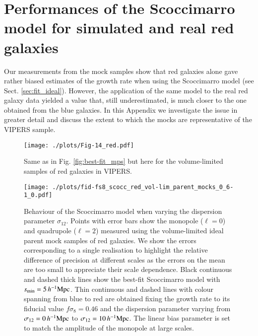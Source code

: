 \documentclass[longauth]{aa}
\def\mhmpc{\,h^{-1}{\rm Mpc}}
\begin{document}
\section{Performances of the Scoccimarro model for simulated and real red galaxies}\label{app:redmodel}
%
Our measurements from the mock samples show that red galaxies alone gave rather biased estimates of the growth rate when using the Scoccimarro model (see Sect. \ref{sec:fit_ideal}). However, the application of the same model to the real red galaxy data yielded a value that, still underestimated, is much closer to the one obtained from the blue galaxies. In this Appendix we investigate the issue in greater detail and discuss the extent to which the mocks are representative of the VIPERS sample.
\begin{figure}
	\centering
	\texttt{[image: ./plots/Fig-14\_red.pdf]}
    \caption{Same as in Fig. \ref{fig:best-fit_mps} but here for the volume-limited samples of red galaxies in VIPERS.} \label{fig:best-fit_mps_red}
\end{figure}
\begin{figure}
	\centering
	\texttt{[image: ./plots/fid-fs8\_scocc\_red\_vol-lim\_parent\_mocks\_0\_6-1\_0.pdf]}
    \caption{Behaviour of the Scoccimarro model when varying the dispersion parameter $\sigma_{12}$. Points with error bars show the monopole ($\ell=0$) and quadrupole ($\ell=2$) measured using the volume-limited ideal parent mock samples of red galaxies. We show the errors corresponding to a single realisation to highlight the relative difference of precision at different scales as the errors on the mean are too small to appreciate their scale dependence. Black continuous and dashed thick lines show the best-fit  Scoccimarro model with $s_{\rm{min}}=5\mhmpc$. Thin continuous and dashed lines with colour spanning from blue to red are obtained fixing the growth rate to its fiducial value $f\sigma_8=0.46$ and the dispersion parameter varying from $\sigma_{12}=0\mhmpc$ to $\sigma_{12}=10\mhmpc$. The linear bias parameter is set to match the amplitude of the monopole at large scales.}\label{fig:scocc_test}
\end{figure}
\end{document}

